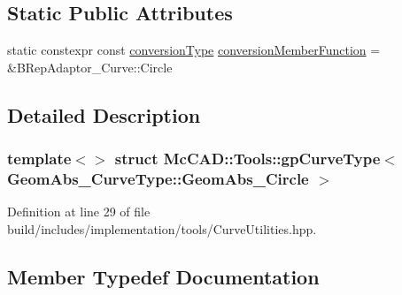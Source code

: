\subsection*{Static Public Attributes}
\begin{DoxyCompactItemize}
\item 
static constexpr const \hyperlink{structMcCAD_1_1Tools_1_1gpCurveType_3_01GeomAbs__CurveType_1_1GeomAbs__Circle_01_4_abd4d90aadd68dfb0068c25797413063d}{conversion\+Type} \hyperlink{structMcCAD_1_1Tools_1_1gpCurveType_3_01GeomAbs__CurveType_1_1GeomAbs__Circle_01_4_a93f63b410bc0be1b29fc1d37f5fa19fe}{conversion\+Member\+Function} = \&B\+Rep\+Adaptor\+\_\+\+Curve\+::\+Circle
\end{DoxyCompactItemize}


\subsection{Detailed Description}
\subsubsection*{template$<$$>$\newline
struct Mc\+C\+A\+D\+::\+Tools\+::gp\+Curve\+Type$<$ Geom\+Abs\+\_\+\+Curve\+Type\+::\+Geom\+Abs\+\_\+\+Circle $>$}



Definition at line 29 of file build/includes/implementation/tools/\+Curve\+Utilities.\+hpp.



\subsection{Member Typedef Documentation}
\mbox{\label{structMcCAD_1_1Tools_1_1gpCurveType_3_01GeomAbs__CurveType_1_1GeomAbs__Circle_01_4_abd4d90aadd68dfb0068c25797413063d}} 
